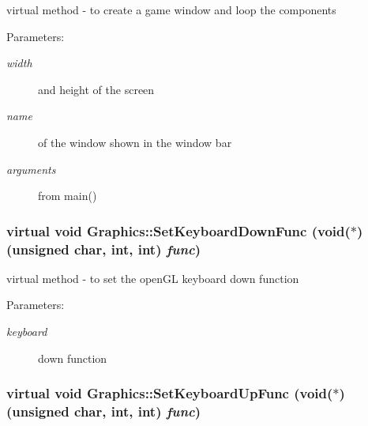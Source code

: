 virtual method - to create a game window and loop the components \begin{Desc}
\item[Parameters:]
\begin{description}
\item[{\em width}]and height of the screen \item[{\em name}]of the window shown in the window bar \item[{\em arguments}]from main() \end{description}
\end{Desc}
\hypertarget{class_graphics_62d9789ca0d11aa4f46847557281550f}{
\subsubsection[SetKeyboardDownFunc]{\setlength{\rightskip}{0pt plus 5cm}virtual void Graphics::SetKeyboardDownFunc (void($\ast$)(unsigned char, int, int) {\em func})}}
\label{class_graphics_62d9789ca0d11aa4f46847557281550f}


virtual method - to set the openGL keyboard down function \begin{Desc}
\item[Parameters:]
\begin{description}
\item[{\em keyboard}]down function \end{description}
\end{Desc}
\hypertarget{class_graphics_6e992aa56d2b7f97b991d776dc808d25}{
\subsubsection[SetKeyboardUpFunc]{\setlength{\rightskip}{0pt plus 5cm}virtual void Graphics::SetKeyboardUpFunc (void($\ast$)(unsigned char, int, int) {\em func})}}
\label{class_graphics_6e992aa56d2b7f97b991d776dc808d25}


